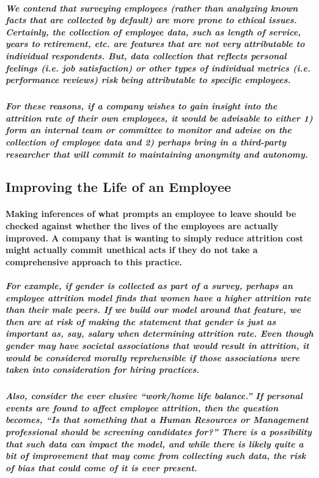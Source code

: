 \documentclass{article}
\begin{document}
\subparagraph{We contend that surveying employees (rather than analyzing known facts that are collected by default) are more prone to ethical issues. Certainly, the collection of employee data, such as length of service, years to retirement, etc. are features that are not very attributable to individual respondents. But, data collection that reflects personal feelings (i.e. job satisfaction) or other types of individual metrics (i.e. performance reviews) risk being attributable to specific employees.}
 
\subparagraph{For these reasons, if a company wishes to gain insight into the attrition rate of their own employees, it would be advisable to either 1) form an internal team or committee to monitor and advise on the collection of employee data and 2) perhaps bring in a third-party researcher that will commit to maintaining anonymity and autonomy.}
 
\subsection{Improving the Life of an Employee}

\paragraph{Making inferences of what prompts an employee to leave should be checked against whether the lives of the employees are actually improved. A company that is wanting to simply reduce attrition cost might actually commit unethical acts if they do not take a comprehensive approach to this practice.}

\subparagraph{For example, if gender is collected as part of a survey, perhaps an employee attrition model finds that women have a higher attrition rate than their male peers. If we build our model around that feature, we then are at risk of making the statement that gender is just as important as, say, salary when determining attrition rate. Even though gender may have societal associations that would result in attrition, it would be considered morally reprehensible if those associations were taken into consideration for hiring practices.}
 
\subparagraph{Also, consider the ever elusive “work/home life balance.” If personal events are found to affect employee attrition, then the question becomes, “Is that something that a Human Resources or Management professional should be screening candidates for?” There is a possibility that such data can impact the model, and while there is likely quite a bit of improvement that may come from collecting such data, the risk of bias that could come of it is ever present.}
 
\end{document}
